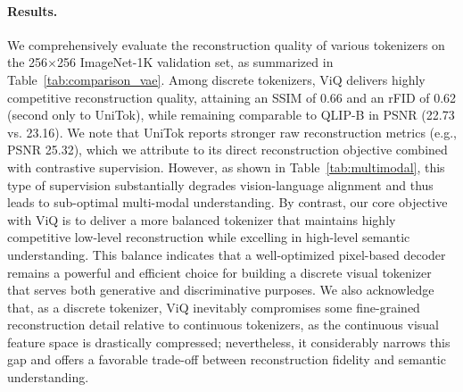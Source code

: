 \documentclass{llmxive}
\begin{document}
\paragraph{Results.}
We comprehensively evaluate the reconstruction quality of various tokenizers on the 256$\times$256 ImageNet-1K validation set, as summarized in Table~\ref{tab:comparison_vae}.
Among discrete tokenizers, ViQ delivers highly competitive reconstruction quality, attaining an SSIM of 0.66 and an rFID of 0.62 (second only to UniTok), while remaining comparable to QLIP-B in PSNR (22.73 vs. 23.16). We note that UniTok reports stronger raw reconstruction metrics (e.g., PSNR 25.32), which we attribute to its direct reconstruction objective combined with contrastive supervision. However, as shown in Table~\ref{tab:multimodal}, this type of supervision substantially degrades vision-language alignment and thus leads to sub-optimal multi-modal understanding. By contrast, our core objective with ViQ is to deliver a more balanced tokenizer that maintains highly competitive low-level reconstruction while excelling in high-level semantic understanding.
This balance indicates that a well-optimized pixel-based decoder remains a powerful and efficient choice for building a discrete visual tokenizer that serves both generative and discriminative purposes.
We also acknowledge that, as a discrete tokenizer, ViQ inevitably compromises some fine-grained reconstruction detail relative to continuous tokenizers, as the continuous visual feature space is drastically compressed; nevertheless, it considerably narrows this gap and offers a favorable trade-off between reconstruction fidelity and semantic understanding.
\end{document}
